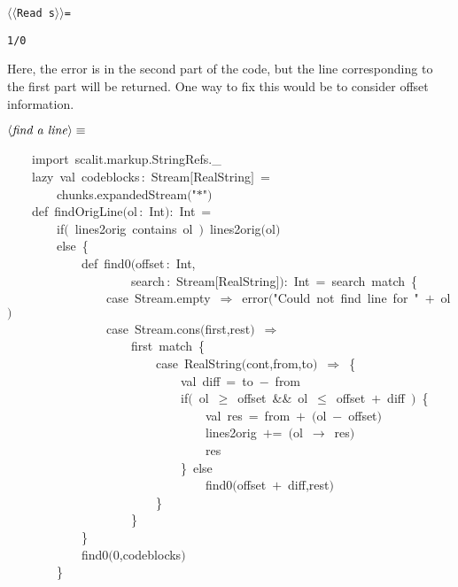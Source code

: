\documentclass[a4paper,12pt]{article}
\begin{document}
\texttt{$\langle$$\langle$Read s$\rangle$$\rangle$=}
\begin{verbatim}
1/0
\end{verbatim}

Here, the error is in the second part of the code, but the line corresponding
to the first part will be returned. One way to fix this would be to consider
offset information.

$\left<\mbox{\emph{find a line}}\right>\equiv$
\begin{program}~~~~{\vem import}~scalit.markup.StringRefs.\_
\\~~~~{\vem lazy}~{\vem val}~codeblocks\,{\rm :}~Stream$[$RealString$]$~=
\\~~~~~~~~chunks.expandedStream$($"$*$"$)$
\\[0.5em]~~~~{\vem def}~findOrigLine$($ol\,{\rm :}~Int$)${\rm :}~Int~=
\\~~~~~~~~{\vem if}$($~lines2orig~contains~ol~$)$~lines2orig$($ol$)$
\\~~~~~~~~{\vem else}~{\small\{}
\\~~~~~~~~~~~~{\vem def}~find0$($offset\,{\rm :}~Int,
\\~~~~~~~~~~~~~~~~~~~~search\,{\rm :}~Stream$[$RealString$]$$)${\rm :}~Int~=~search~{\vem match}~{\small\{}
\\~~~~~~~~~~~~~~~~{\vem case}~Stream.empty~$\Rightarrow$~error$($"Could~not~find~line~{\vem for}~"~$+$~ol$)$
\\~~~~~~~~~~~~~~~~{\vem case}~Stream.cons$($first,rest$)$~$\Rightarrow$
\\~~~~~~~~~~~~~~~~~~~~first~{\vem match}~{\small\{}
\\~~~~~~~~~~~~~~~~~~~~~~~~{\vem case}~RealString$($cont,from,to$)$~$\Rightarrow$~{\small\{}
\\~~~~~~~~~~~~~~~~~~~~~~~~~~~~{\vem val}~diff~=~to~$-$~from
\\~~~~~~~~~~~~~~~~~~~~~~~~~~~~{\vem if}$($~ol~$\geq$~offset~\&\&~ol~$\leq$~offset~$+$~diff~$)$~{\small\{}
\\~~~~~~~~~~~~~~~~~~~~~~~~~~~~~~~~{\vem val}~res~=~from~$+$~$($ol~$-$~offset$)$
\\~~~~~~~~~~~~~~~~~~~~~~~~~~~~~~~~lines2orig~$+$=~$($ol~$\rightarrow$~res$)$
\\~~~~~~~~~~~~~~~~~~~~~~~~~~~~~~~~res
\\~~~~~~~~~~~~~~~~~~~~~~~~~~~~{\small\}}~{\vem else}
\\~~~~~~~~~~~~~~~~~~~~~~~~~~~~~~~~find0$($offset~$+$~diff,rest$)$
\\~~~~~~~~~~~~~~~~~~~~~~~~{\small\}}
\\~~~~~~~~~~~~~~~~~~~~{\small\}}
\\~~~~~~~~~~~~{\small\}}
\\[0.5em]~~~~~~~~~~~~find0$($0,codeblocks$)$
\\~~~~~~~~{\small\}}
\\[0.5em]\end{program}
\end{document}
